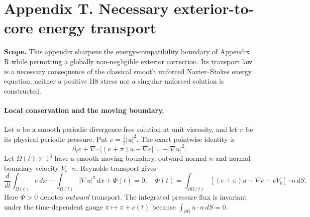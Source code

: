 \clearpage
\section*{Appendix T. Necessary exterior-to-core energy transport}
\noindent\textbf{Scope.} This appendix sharpens the energy-compatibility
boundary of Appendix R while permitting a globally non-negligible
exterior correction. Its transport law is a necessary consequence of
the classical smooth unforced Navier--Stokes energy equation; neither
a positive H8 stress nor a singular unforced solution is constructed.

\paragraph{Local conservation and the moving boundary.}
Let $u$ be a smooth periodic divergence-free solution at unit viscosity,
and let $\pi$ be its physical periodic pressure. Put
$e=\frac12|u|^2$. The exact pointwise identity is
\begin{equation}\label{eq:T-local-energy}
 \partial_t e+
 \nabla\cdot\bigl[(e+\pi)u-\nabla e\bigr]
 =-|\nabla u|^2.
\end{equation}
Let $\Omega(t)\Subset\mathbb T^3$ have a smooth moving boundary,
outward normal $n$ and normal boundary velocity $V_b\cdot n$.
Reynolds transport gives
\begin{equation}\label{eq:T-moving-domain}
 \frac{d}{dt}\int_{\Omega(t)}e\,dx+
 \int_{\Omega(t)}|\nabla u|^2\,dx+
 \Phi(t)=0,\quad
 \Phi(t)=\int_{\partial\Omega(t)}
 \left[(e+\pi)u-\nabla e-eV_b\right]\cdot n\,dS.
\end{equation}
Here $\Phi>0$ denotes \emph{outward} transport. The
integrated pressure flux is invariant under the time-dependent
gauge $\pi\mapsto\pi+c(t)$ because
$\int_{\partial\Omega}u\cdot n\,dS=0$.

